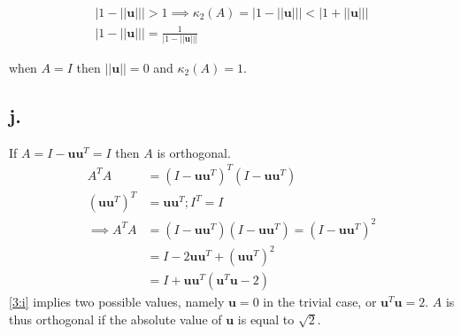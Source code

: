 \documentclass[00-main.tex]{subfiles}
\begin{document}
\begin{align*}
|1-||\textbf{u}||| > 1 \implies \kappa_2(A) = |1-||\textbf{u}||| < |1+||\textbf{u}||| \\
|1-||\textbf{u}||| = \frac{1}{|1-||\textbf{u}|||} 
\end{align*}

when $A=I$ then $||\textbf{u}||=0$ and $\kappa_2(A) = 1$.

\subsection*{j.}
If $A = I - \mathbf{uu}^T = I$ then $A$ is orthogonal.
\begin{align}
\nonumber
A^T A &= (I - \mathbf{uu}^T )^T (I - \mathbf{uu}^T) \\
\nonumber
(\mathbf{uu}^T)^T &= \mathbf{uu}^T; I^T = I \\
\implies
\nonumber
A^T A &= (I - \mathbf{uu}^T ) (I - \mathbf{uu}^T) = (I - \mathbf{uu}^T)^2 \\
\nonumber 
&= I - 2 \mathbf{uu}^T + ( \mathbf{uu}^T)^2 \\
&= I + \mathbf{uu}^T (\mathbf{u}^T\mathbf{u} - 2)
\label{3:i}
\end{align}
\cref{3:i} implies two possible values, namely $\mathbf{u} = 0$ in the trivial case, or $\mathbf{u}^T\mathbf{u} = 2$.
$A$ is thus orthogonal if the absolute value of  $\mathbf{u}$ is equal to $\sqrt{2}$.


\end{document}
